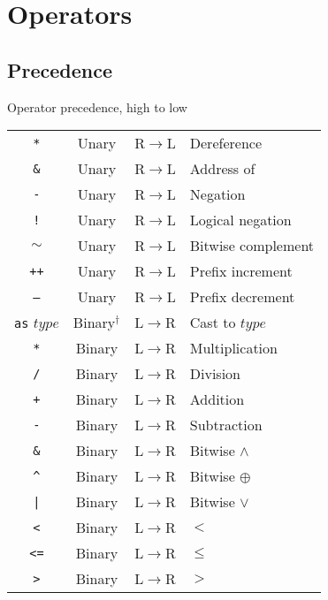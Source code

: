 \documentclass{article}
\begin{document}
\section{Operators}
\label{sec:operators}

\subsection{Precedence}
\label{sub:operators:precedence}
\begin{center}
  \begin{threeparttable}
    \caption{Operator precedence, high to low}
    \begin{tabular}{|c|c|c|l|}
      \hline
      \texttt{*} & Unary & R$\to$L & Dereference \\
      \texttt{\&} & Unary & R$\to$L & Address of \\
      \texttt{-} & Unary & R$\to$L & Negation \\
      \texttt{!} & Unary & R$\to$L & Logical negation \\
      \texttt{$\sim$} & Unary & R$\to$L & Bitwise complement \\ \hline
      \texttt{++} & Unary & R$\to$L & Prefix increment \\
      \texttt{--} & Unary & R$\to$L & Prefix decrement \\ \hline
      \texttt{as} $type$ & Binary$^\dagger$ & L$\to$R & Cast to $type$ \\ \hline
      \texttt{*} & Binary & L$\to$R & Multiplication \\
      \texttt{/} & Binary & L$\to$R & Division \\ \hline
      \texttt{+} & Binary & L$\to$R & Addition \\
      \texttt{-} & Binary & L$\to$R & Subtraction \\ \hline
      \texttt{\&} & Binary & L$\to$R & Bitwise $\land$ \\ \hline
      \texttt{\^} & Binary & L$\to$R & Bitwise $\oplus$ \\ \hline
      \texttt{|} & Binary & L$\to$R & Bitwise $\lor$ \\ \hline
      \texttt{<} & Binary & L$\to$R & $<$ \\
      \texttt{<=} & Binary & L$\to$R & $\leq$ \\
      \texttt{>} & Binary & L$\to$R & $>$ \\

\end{tabular}
\end{threeparttable}
\end{center}
\end{document}
